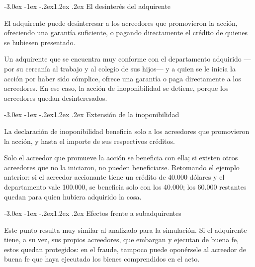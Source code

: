 \documentclass[12pt,oneside]{book}
\makeatletter
\renewcommand\section{\@startsection{section}{1}{\z@}%
  {-3.0ex \@plus -1ex \@minus -.2ex}{1.2ex \@plus .2ex}%
  {\normalfont\large\bfseries\color{acento}}}
\makeatother
\begin{document}
\section{El desinterés del adquirente}

\begin{regla}
El adquirente puede desinteresar a los acreedores que promovieron la acción, ofreciendo una garantía suficiente, o pagando directamente el crédito de quienes se hubiesen presentado.
\end{regla}

\begin{ejemplo}
Un adquirente que se encuentra muy conforme con el departamento adquirido ---por su cercanía al trabajo y al colegio de sus hijos--- y a quien se le inicia la acción por haber sido cómplice, ofrece una garantía o paga directamente a los acreedores. En ese caso, la acción de inoponibilidad se detiene, porque los acreedores quedan desinteresados.
\end{ejemplo}

\section{Extensión de la inoponibilidad}

\begin{regla}
La declaración de inoponibilidad beneficia solo a los acreedores que promovieron la acción, y hasta el importe de sus respectivos créditos.
\end{regla}

Solo el acreedor que promueve la acción se beneficia con ella; si existen otros acreedores que no la iniciaron, no pueden beneficiarse. Retomando el ejemplo anterior: si el acreedor accionante tiene un crédito de 40.000 dólares y el departamento vale 100.000, se beneficia solo con los 40.000; los 60.000 restantes quedan para quien hubiera adquirido la cosa.

\section{Efectos frente a subadquirentes}

Este punto resulta muy similar al analizado para la simulación. Si el adquirente tiene, a su vez, sus propios acreedores, que embargan y ejecutan de buena fe, estos quedan protegidos: en el fraude, tampoco puede oponérsele al acreedor de buena fe que haya ejecutado los bienes comprendidos en el acto.
\end{document}
